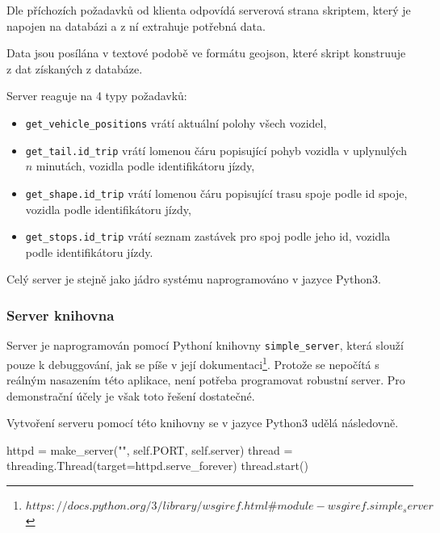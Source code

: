 Dle příchozích požadavků od klienta odpovídá serverová strana skriptem, který je napojen na databázi a z ní extrahuje potřebná data.


\bigbreak


Data jsou posílána v textové podobě ve formátu \gls{geojson}, které skript konstruuje z dat získaných z databáze.


\bigbreak


Server reaguje na 4 typy požadavků:


\begin{itemize}
	\item \verb-get_vehicle_positions- vrátí aktuální polohy všech vozidel,


	\item \verb-get_tail.id_trip- vrátí lomenou čáru popisující pohyb vozidla v uplynulých $n$ minutách, vozidla podle identifikátoru jízdy,


	\item \verb-get_shape.id_trip- vrátí lomenou čáru popisující trasu spoje podle id spoje, vozidla podle identifikátoru jízdy,


	\item \verb-get_stops.id_trip- vrátí seznam zastávek pro spoj podle jeho id, vozidla podle identifikátoru jízdy.
\end{itemize}


Celý server je stejně jako jádro systému naprogramováno v jazyce Python3.


\subsubsection{Server knihovna}


Server je naprogramován pomocí Pythoní knihovny \verb-simple_server-, která slouží pouze k debuggování, jak se píše v její dokumentaci\footnote{$https://docs.python.org/3/library/wsgiref.html\#module-wsgiref.simple_server$}. Protože se nepočítá s reálným nasazením této aplikace, není potřeba programovat robustní server. Pro demonstrační účely je však toto řešení dostatečné.


\bigbreak


Vytvoření serveru pomocí této knihovny se v jazyce Python3 udělá následovně.


\begin{code}[frame=none]
httpd = make_server("", self.PORT, self.server)
thread = threading.Thread(target=httpd.serve_forever)
thread.start()
\end{code}


